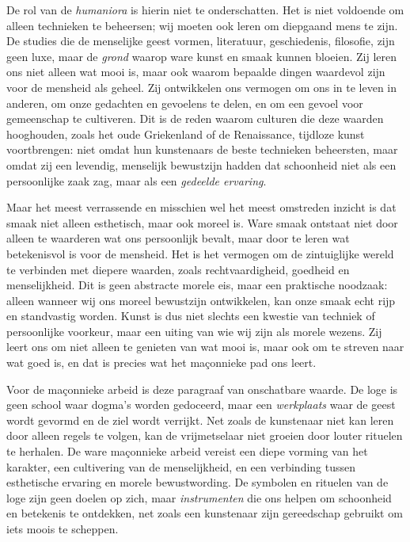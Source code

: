 \begin{mdframed}[leftmargin=0pt,rightmargin=0pt,backgroundcolor=blue!6,linecolor=white,innertopmargin=6pt,innerbottommargin=6pt]
De rol van de \textit{humaniora} is hierin niet te onderschatten. Het is niet voldoende om alleen technieken te beheersen; wij moeten ook leren om diepgaand mens te zijn. De studies die de menselijke geest vormen, literatuur, geschiedenis, filosofie, zijn geen luxe, maar de \textit{grond} waarop ware kunst en smaak kunnen bloeien. Zij leren ons niet alleen wat mooi is, maar ook waarom bepaalde dingen waardevol zijn voor de mensheid als geheel. Zij ontwikkelen ons vermogen om ons in te leven in anderen, om onze gedachten en gevoelens te delen, en om een gevoel voor gemeenschap te cultiveren. Dit is de reden waarom culturen die deze waarden hooghouden, zoals het oude Griekenland of de Renaissance, tijdloze kunst voortbrengen: niet omdat hun kunstenaars de beste technieken beheersten, maar omdat zij een levendig, menselijk bewustzijn hadden dat schoonheid niet als een persoonlijke zaak zag, maar als een \textit{gedeelde ervaring}.

Maar het meest verrassende en misschien wel het meest omstreden inzicht is dat smaak niet alleen esthetisch, maar ook moreel is. Ware smaak ontstaat niet door alleen te waarderen wat ons persoonlijk bevalt, maar door te leren wat betekenisvol is voor de mensheid. Het is het vermogen om de zintuiglijke wereld te verbinden met diepere waarden, zoals rechtvaardigheid, goedheid en menselijkheid. Dit is geen abstracte morele eis, maar een praktische noodzaak: alleen wanneer wij ons moreel bewustzijn ontwikkelen, kan onze smaak echt rijp en standvastig worden. Kunst is dus niet slechts een kwestie van techniek of persoonlijke voorkeur, maar een uiting van wie wij zijn als morele wezens. Zij leert ons om niet alleen te genieten van wat mooi is, maar ook om te streven naar wat goed is, en dat is precies wat het maçonnieke pad ons leert.

Voor de maçonnieke arbeid is deze paragraaf van onschatbare waarde. De loge is geen school waar dogma's worden gedoceerd, maar een \textit{werkplaats} waar de geest wordt gevormd en de ziel wordt verrijkt. Net zoals de kunstenaar niet kan leren door alleen regels te volgen, kan de vrijmetselaar niet groeien door louter rituelen te herhalen. De ware maçonnieke arbeid vereist een diepe vorming van het karakter, een cultivering van de menselijkheid, en een verbinding tussen esthetische ervaring en morele bewustwording. De symbolen en rituelen van de loge zijn geen doelen op zich, maar \textit{instrumenten} die ons helpen om schoonheid en betekenis te ontdekken, net zoals een kunstenaar zijn gereedschap gebruikt om iets moois te scheppen.


\end{mdframed}
